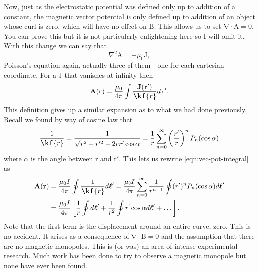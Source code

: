 \documentclass[10pt, twocolumn]{article}
\theoremstyle{definition}
\newcommand{\bv}[1]{\bm{\mathrm{#1}}}
\newcommand{\scriptr}{\fontsize{12pt}{12pt}\kf{r}\fontsize{10pt}{10pt}}
\begin{document}
Now, just as the electrostatic potential was defined only up to addition of a constant,
the magnetic vector potential is only defined up to addition of an object whose curl is zero, which will have no effect on $\bv{B}$.
This allows us to set $\bv{\nabla}\cdot\bv{A}=0$. You can prove this but it is not particularly enlightening here so I will omit it.
With this change we can say that
$$
  \nabla^2\bv{A}=-\mu_0\bv{J},
$$
Poisson's equation again, actually three of them - one for each cartesian coordinate. For a $\bv{J}$ that vanishes at infinity then
\begin{equation}
  \bv{A}(\bv{r})=\frac{\mu_0}{4\pi}\int \frac{\bv{J}(\bv{r}')}{\scriptr}d\tau'.
  \label{eqn:vec-pot-integral}
\end{equation}
This definition gives up a similar expansion as to what we had done previously. Recall we found by way of cosine law that
$$\frac{1}{\scriptr}=\frac{1}{\sqrt{r^2+r'^2-2rr'\cos\alpha}}=\frac{1}{r}\sum_{n=0}^{\infty}\left(\frac{r'}{r}\right)^nP_n(\cos\alpha)$$
where $\alpha$ is the angle between $\bv{r}$ and $\bv{r}'$. This lets us rewrite \cref{eqn:vec-pot-integral} as
\begin{align}
  \bv{A}(\bv{r}) & =\frac{\mu_0I}{4\pi}\oint \frac{1}{\scriptr}d\bv{\ell}'=\frac{\mu_0I}{4\pi}\sum_{n=0}^{\infty}\frac{1}{r^{n+1}}\oint (r')^nP_n(\cos\alpha)d\bv{\ell}'\nonumber \\
                 & =\frac{\mu_0I}{4\pi}\left[\frac{1}{r}\oint d\bv{\ell}'+\frac{1}{r^2}\oint r'\cos\alpha d\bv{\ell}'+\dots\right].
\end{align}
Note that the first term is the displacement around an entire curve, zero. This is no accident. It arises as a consequence of
$\bv{\nabla}\cdot\bv{B}=0$ and the assumption that there are no magnetic monopoles. This is (or was) an area of intense
experimental research. Much work has been done to try to observe a magnetic monopole but none have ever been found.
\end{document}
